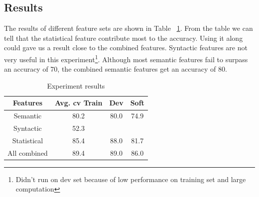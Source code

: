 \subsection{Results}
The results of different feature sets are shown in Table ~\ref{tab:040res}. From the table we can tell that the statistical feature contribute most to the accuracy. Using it along could gave us a result close to the combined features. Syntactic features are not very useful in this experiment\footnote{Didn't run on dev set because of low performance on training set and large computation}. Although most semantic features fail to surpass an accuracy of 70, the combined semantic features get an accuracy of 80.
\begin{table}[!h]
	\begin{center}
		\begin{tabular}{|c|c|c|c|}
		\hline
		Features&Avg. cv Train&Dev&Soft\\
		\hline
		Semantic & 80.2 & 80.0 & 74.9\\
		Syntactic & 52.3 & &\\
		Statistical & 85.4 &88.0&81.7\\
		All combined & 89.4 & 89.0&86.0\\
		\hline
		\end{tabular}
	\end{center}
	\label{tab:040res}
	\caption{Experiment results}
\end{table}